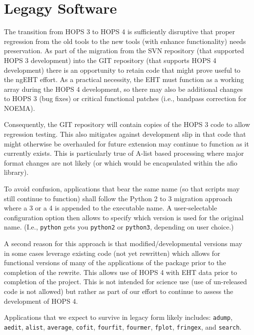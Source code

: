 %
%
\section{Legagy Software}

The transition from HOPS 3 to HOPS 4 is sufficiently disruptive that proper
regression from the old tools to the new tools (with enhance functionality)
needs preservation.  As part of the migration from the SVN repository (that
supported HOPS 3 development) into the GIT repository (that supports HOPS 4
development) there is an opportunity to retain code that might prove useful
to the ngEHT effort.  As a practical necessity, the EHT must function as a
working array during the HOPS 4 development, so there may also be additional
changes to HOPS 3 (bug fixes) or critical functional patches (i.e., bandpass
correction for NOEMA).

Consequently, the GIT repository will contain copies of the HOPS 3 code to
allow regression testing.  This also mitigates against development slip in
that code that might otherwise be overhauled for future extension may continue
to function as it currently exists.  This is particularly true of A-list based
processing where major format changes are not likely (or which would be
encapsulated within the afio library).

To avoid confusion, applications that bear the same name (so that scripts may
still continue to function) shall follow the Python 2 to 3 migration approach
where a 3 or a 4 is appended to the executable name.  A user-selectable
configuration option then allows to specify which version is used for the
original name.  (I.e.,
\texttt{python} gets you 
\texttt{python2} or 
\texttt{python3}, depending on user choice.)

A second reason for this approach is that modified/developmental versions may
in some cases leverage existing code (not yet rewritten) which allows for
functional versions of many of the applications of the package prior to the
completion of the rewrite.  This allows use of HOPS 4 with EHT data prior to
completion of the project.  This is not intended for science use (use of
un-released code is not allowed) but rather as part of our effort to continue
to assess the development of HOPS 4.

Applications that we expect to survive in legacy form likely includes:
\texttt{adump},
\texttt{aedit},
\texttt{alist},
\texttt{average},
\texttt{cofit},
\texttt{fourfit},
\texttt{fourmer},
\texttt{fplot},
\texttt{fringex},
and
\texttt{search}.

%
%
